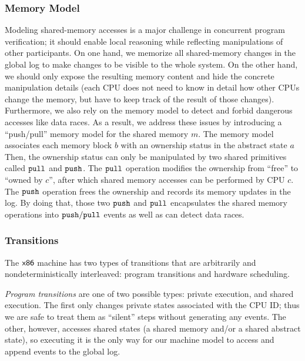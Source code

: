 \subsubsection{Memory Model}

Modeling shared-memory accesses is 
a major challenge in concurrent program verification;
it should enable local reasoning while reflecting 
manipulations of other participants.
On one hand, 
we memorize all shared-memory changes in the global log to make changes to be visible to the whole system. 
On the other hand,  
we should  only expose the resulting memory 
content and hide the concrete manipulation details
(each CPU does not need to know in detail how other CPUs 
change the memory, but have to keep track of the result of those changes).
Furthermore, we also rely on the memory model
to detect and forbid dangerous accesses like data races.
As a result, we address these issues by
introducing
a  ``push/pull'' memory model for the shared memory $m$.
The memory model associates each memory block $b$
with an ownership status in the abstract state $a$
Then, the ownership status can only be manipulated by 
two shared primitives called ${\mathrm{\texttt{pull}}}$ and ${\mathrm{\texttt{push}}}$.
The ${\mathrm{\texttt{pull}}}$ operation modifies the ownership from ``free'' to  ``owned by $c$'', after which shared memory accesses
can be performed by CPU $c$. The ${\mathrm{\texttt{push}}}$ operation frees the ownership and records its memory updates in the log.
By doing that, those two ${\mathrm{\texttt{push}}}$ and ${\mathrm{\texttt{pull}}}$ encapsulates the shared memory operations
into ${\mathrm{\texttt{push}}}/{\mathrm{\texttt{pull}}}$ events as well as can detect data races.


%
%

\subsubsection{Transitions}

The $\mathsf{x86}$ machine 
has two types of transitions that are arbitrarily and nondeterministically 
interleaved: 
program transitions and hardware scheduling.

\emph{Program transitions} are one of two possible types:
private execution, and shared execution.
The first  only changes private states associated with the CPU ID;
thus we are safe to treat them as ``silent'' steps without generating any events. 
The other, however, 
accesses shared states (a shared memory and/or a shared abstract state),
so executing it is  the only way for our machine model  to access and append events to the global log.

